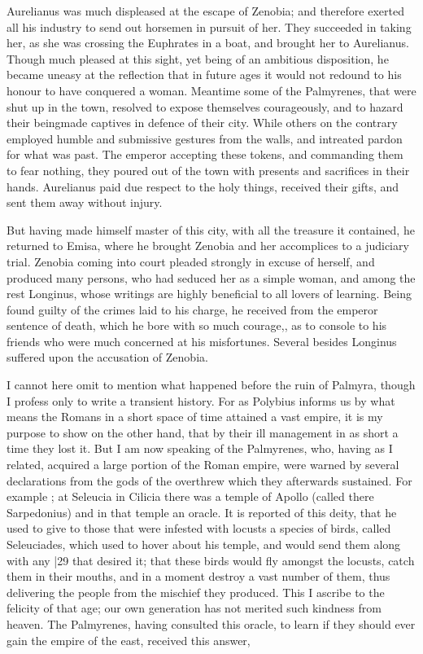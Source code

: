 Aurelianus was much displeased at the escape of Zenobia; and therefore exerted all his industry to send out horsemen in pursuit of her. They succeeded in taking her, as she was crossing the Euphrates in a boat, and brought her to Aurelianus. Though much pleased at this sight, yet being of an ambitious disposition, he became uneasy at the reflection that in future ages it would not redound to his honour to have conquered a woman. Meantime some of the Palmyrenes, that were shut up in the town, resolved to expose themselves courageously, and to hazard their beingmade captives in defence of their city. While others on the contrary employed humble and submissive gestures from the walls, and intreated pardon for what was past. The emperor accepting these tokens, and commanding them to fear nothing, they poured out of the town with presents and sacrifices in their hands. Aurelianus paid due respect to the holy things, received their gifts, and sent them away without injury.

But having made himself master of this city, with all the treasure it contained, he returned to Emisa, where he brought Zenobia and her accomplices to a judiciary trial. Zenobia coming into court pleaded strongly in excuse of herself, and produced many persons, who had seduced her as a simple woman, and among the rest Longinus, whose writings are highly beneficial to all lovers of learning. Being found guilty of the crimes laid to his charge, he received from the emperor sentence of death, which he bore with so much courage,, as to console to his friends who were much concerned at his misfortunes. Several besides Longinus suffered upon the accusation of Zenobia.

I cannot here omit to mention what happened before the ruin of Palmyra, though I profess only to write a transient history. For as Polybius informs us by what means the Romans in a short space of time attained a vast empire, it is my purpose to show on the other hand, that by their ill management in as short a time they lost it. But I am now speaking of the Palmyrenes, who, having as I related, acquired a large portion of the Roman empire, were warned by several declarations from the gods of the overthrew which they afterwards sustained. For example ; at Seleucia in Cilicia there was a temple of Apollo (called there Sarpedonius) and in that temple an oracle. It is reported of this deity, that he used to give to those that were infested with locusts a species of birds, called Seleuciades, which used to hover about his temple, and would send them along with any
|29 that desired it; that these birds would fly amongst the locusts, catch them in their mouths, and in a moment destroy a vast number of them, thus delivering the people from the mischief they produced. This I ascribe to the felicity of that age; our own generation has not merited such kindness from heaven. The Palmyrenes, having consulted this oracle, to learn if they should ever gain the empire of the east, received this answer,

